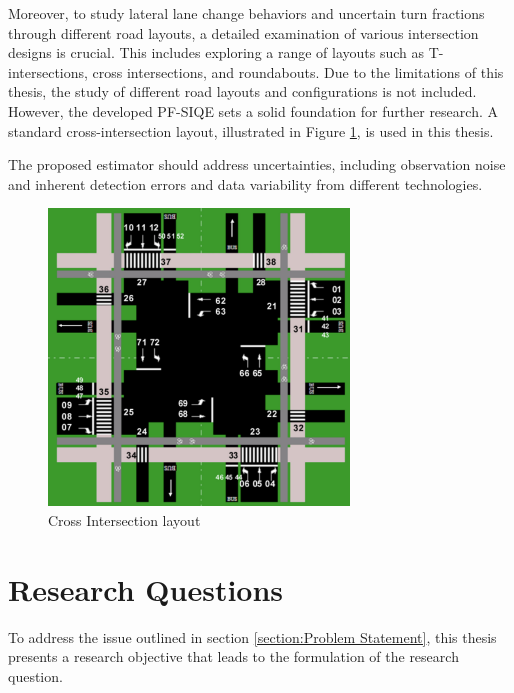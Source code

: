 Moreover, to study lateral lane change behaviors and uncertain turn fractions through different road layouts, a detailed examination of various intersection designs is crucial. This includes exploring a range of layouts such as T-intersections, cross intersections, and roundabouts. Due to the limitations of this thesis, the study of different road layouts and configurations is not included. However, the developed PF-SIQE sets a solid foundation for further research. A standard cross-intersection layout, illustrated in Figure \ref{fig: standard layout}, is used in this thesis.

The proposed estimator should address uncertainties, including observation noise and inherent detection errors and data variability from different technologies.

  \begin{figure}[htp]
  \centering
    \includegraphics[width=8cm]{figures/standard.png}
    \caption{Cross Intersection layout}
    \label{fig: standard layout}
\end{figure}
  
\section{Research Questions}
To address the issue outlined in section \ref{section:Problem Statement}, this thesis presents a research objective that leads to the formulation of the research question.
